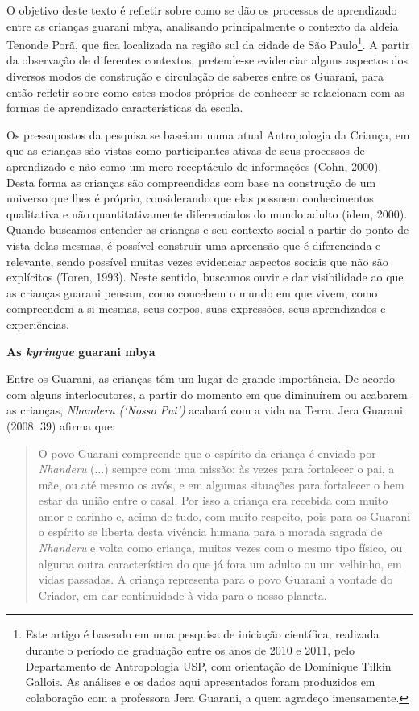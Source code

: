 O objetivo deste texto é refletir sobre como se dão os processos de
aprendizado entre as crianças guarani mbya, analisando principalmente o
contexto da aldeia Tenonde Porã, que fica localizada na região sul da
cidade de São Paulo\footnote{Este artigo é baseado em uma pesquisa de
  iniciação científica, realizada durante o período de graduação entre
  os anos de 2010 e 2011, pelo Departamento de Antropologia USP, com
  orientação de Dominique Tilkin Gallois. As análises e os dados aqui
  apresentados foram produzidos em colaboração com a professora Jera
  Guarani, a quem agradeço imensamente.}. A partir da observação de
diferentes contextos, pretende-se evidenciar alguns aspectos dos
diversos modos de construção e circulação de saberes entre os Guarani,
para então refletir sobre como estes modos próprios de conhecer se
relacionam com as formas de aprendizado características da escola.

Os pressupostos da pesquisa se baseiam numa atual Antropologia da
Criança, em que as crianças são vistas como participantes ativas de seus
processos de aprendizado e não como um mero receptáculo de informações
(Cohn, 2000). Desta forma as crianças são compreendidas com base na
construção de um universo que lhes é próprio, considerando que elas
possuem conhecimentos qualitativa e não quantitativamente diferenciados
do mundo adulto (idem, 2000). Quando buscamos entender as crianças e seu
contexto social a partir do ponto de vista delas mesmas, é possível
construir uma apreensão que é diferenciada e relevante, sendo possível
muitas vezes evidenciar aspectos sociais que não são explícitos (Toren,
1993). Neste sentido, buscamos ouvir e dar visibilidade ao que as
crianças guarani pensam, como concebem o mundo em que vivem, como
compreendem a si mesmas, seus corpos, suas expressões, seus aprendizados
e experiências.

\textbf{As \emph{kyringue} guarani mbya}

Entre os Guarani, as crianças têm um lugar de grande importância. De
acordo com alguns interlocutores, a partir do momento em que diminuírem
ou acabarem as crianças, \emph{Nhanderu (`Nosso Pai')} acabará com a
vida na Terra. Jera Guarani (2008: 39) afirma que:

\begin{quote}
O povo Guarani compreende que o espírito da criança é enviado por
\emph{Nhanderu} (...) sempre com uma missão: às vezes para fortalecer o
pai, a mãe, ou até mesmo os avós, e em algumas situações para fortalecer
o bem estar da união entre o casal. Por isso a criança era recebida com
muito amor e carinho e, acima de tudo, com muito respeito, pois para os
Guarani o espírito se liberta desta vivência humana para a morada
sagrada de \emph{Nhanderu} e volta como criança, muitas vezes com o
mesmo tipo físico, ou alguma outra característica do que já fora um
adulto ou um velhinho, em vidas passadas. A criança representa para o
povo Guarani a vontade do Criador, em dar continuidade à vida para o
nosso planeta.
\end{quote}

